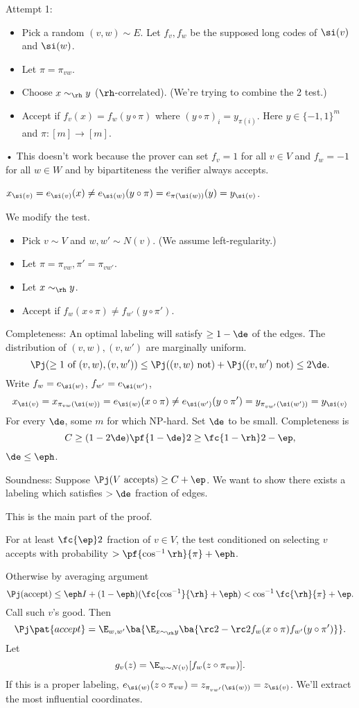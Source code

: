 Attempt 1: 
\begin{itemize}
\item
Pick a random $(v,w)\sim E$. Let $f_v,f_w$ be the supposed long codes of $\si(v)$ and $\si(w)$. 
\item
Let $\pi=\pi_{vw}$.
\item
Choose $x\sim_\rh y$ ($\rh$-correlated).
(We're trying to combine the 2 test.)
\item
Accept if $f_v(x)=f_w(y\circ \pi)$ where $(y\circ \pi)_i = y_{\pi(i)}$. Here $y\in \{-1,1\}^m$ and $\pi:[m]\to [m]$.
\end{itemize}•
This doesn't work because the prover can set $f_v=1$ for all $v\in V$ and $f_w=-1$ for all $w\in W$ and by bipartiteness the verifier always accepts.

$x_{\si(v)}=e_{\si(v)}(x)\ne e_{\si(w)}(y\circ \pi) = e_{\pi(\si(w))}(y) = y_{\si(v)}$.

We modify the test.
\begin{itemize}
\item
Pick $v\sim V$ and $w,w'\sim N(v)$. (We assume left-regularity.)
\item
Let $\pi=\pi_{vw},\pi'=\pi_{vw'}$.
\item Let $x\sim_\rh y$.
\item
Accept if $f_w(x\circ \pi)\ne f_{w'}(y\circ \pi')$. 
\end{itemize}

Completeness: An optimal labeling will satisfy $\ge 1-\de$ of the edges. The distribution of $(v,w),(v,w')$ are marginally uniform. 
\[
\Pj(\ge1\text{ of }(v,w),(v,w'))\le \Pj((v,w)\text{ not})+\Pj((v,w')\text{ not})\le 2\de.
\]
Write $f_w=e_{\si(w)}$, $f_{w'}=e_{\si(w')}$, 
\[
x_{\si(v)}=
x_{\pi_{vw}(\si(w))} = e_{\si(w)}(x\circ \pi) \ne e_{\si(w')} (y\circ \pi') = y_{\pi_{vw'}(\si(w'))} =y_{\si(v)} 
\]
For every $\de$, some $m$ for which NP-hard. Set $\de$ to be small.
Completeness is
\[
C\ge (1-2\de) \pf{1-\de}2 \ge \fc{1-\rh}2-\ep,
\]
$\de\le \eph$.

Soundness: Suppose $\Pj(V\text{ accepts})\ge C+\ep$. We want to show there exists a labeling which satisfies $>\de$ fraction of edges.

This is the main part of the proof.

For at least $\fc{\ep}2$ fraction of $v\in V$, the test conditioned on selecting $v$ accepts with probability $>\pf{\cos^{-1}\rh}{\pi}+\eph$.

Otherwise by averaging argument 
\[\Pj(\text{accept})\le \eph I + (1-\eph) (\fc{\cos^{-1}}{\rh} + \eph)<\cos^{-1}\fc{\rh}{\pi}+\ep.\]
Call such $v$'s good. Then 
\[
\Pj\pat{accept} = \E_{w,w'}\ba{
\E_{x\sim_\rh y} \ba{
\rc2-\rc2 f_w(x\circ \pi) f_{w'}(y\circ \pi')
}
}.
\]
Let 
\[
g_v(z)=\E_{w\sim N(v)}[f_w(z\circ \pi_{vw})].
\]
If this is a proper labeling, $e_{\si(w)}(z\circ \pi_{vw})=z_{\pi_{vw'}(\si(w))} = z_{\si(v)}$.
We'll extract the most influential coordinates.

